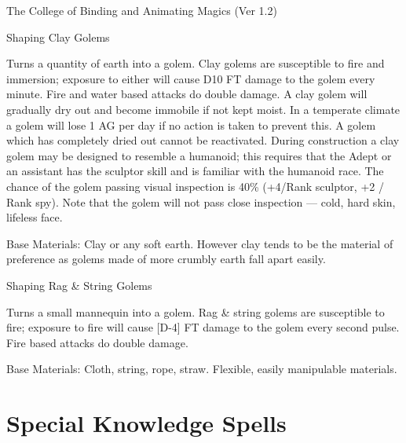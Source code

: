 \begin{Chapter}{The College of Binding and Animating Magics (Ver 1.2)}
\begin{ritual}[Q-3]{Shaping Clay Golems}
\begin{effects}
Turns a quantity of earth into a golem.  Clay golems are susceptible
to fire and immersion; exposure to either will cause D10 FT damage to
the golem every minute.  Fire and water based attacks do double
damage.  A clay golem will gradually dry out and become immobile if
not kept moist.  In a temperate climate a golem will lose 1 AG per day
if no action is taken to prevent this. A golem which has completely
dried out cannot be reactivated. During construction a clay golem may
be designed to resemble a humanoid; this requires that the Adept or an
assistant has the sculptor skill and is familiar with the humanoid
race. The chance of the golem passing visual inspection is 40\%
(+4/Rank sculptor, +2 / Rank spy).  Note that the golem will not pass
close inspection — cold, hard skin, lifeless face.

Base Materials: Clay or any soft earth.  However clay tends to be the
material of preference as golems made of more crumbly earth fall apart
easily.
\end{effects}
\end{ritual}

\begin{ritual}[Q-4]{Shaping Rag \& String Golems}
\begin{effects}
Turns a small mannequin into a golem.  Rag \& string golems are
susceptible to fire; exposure to fire will cause [D-4] FT damage to
the golem every second pulse.  Fire based attacks do double damage.

Base Materials: Cloth, string, rope, straw. Flexible, easily
manipulable materials.
\end{effects}
\end{ritual}

\section{Special Knowledge Spells}


\end{Chapter}
